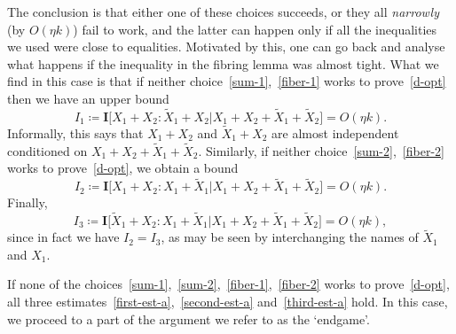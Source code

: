\documentclass[12pt,reqno,tbtags]{amsart}
\theoremstyle{definition}
\theoremstyle{remark}
\newcommand{\bigI}[1]{\mathbf{I}\big[#1\big]}
\numberwithin{equation}{section}
\begin{document}
The conclusion is that either one of these choices succeeds, or they all \emph{narrowly} (by $O(\eta k)$) fail to work, and the latter can happen only if all the inequalities we used were close to equalities. Motivated by this, one can go back and analyse what happens if the inequality in the fibring lemma was almost tight.
What we find in this case is that if neither choice~\eqref{sum-1},~\eqref{fiber-1} works to prove~\eqref{d-opt} then we have an upper bound
\begin{equation}\label{first-est-a}
  I_1 \coloneqq \bigI{ X_1+X_2 : \tilde X_1 + X_2 | X_1+X_2+\tilde X_1+\tilde X_2 } = O(\eta k).
\end{equation}
Informally, this says that $X_1 + X_2$ and $\tilde X_1 + X_2$ are almost independent conditioned on $X_1+X_2+\tilde X_1+\tilde X_2$.
Similarly, if neither choice~\eqref{sum-2},~\eqref{fiber-2} works to prove~\eqref{d-opt}, we obtain a bound
\begin{equation}\label{second-est-a}
  I_2 \coloneqq \bigI{ X_1+X_2 : X_1 + \tilde X_1 | X_1+X_2+\tilde X_1+\tilde X_2 } = O(\eta k).
\end{equation}
Finally,
\begin{equation}\label{third-est-a}
 I_3 \coloneqq \bigI{ \tilde X_1+X_2 : X_1 + \tilde X_1 | X_1+X_2+\tilde X_1+\tilde X_2 } = O(\eta k),
 \end{equation}
 since in fact we have $I_2 = I_3$, as may be seen by interchanging the names of $\tilde X_1$ and $X_1$.


If none of the choices~\eqref{sum-1},~\eqref{sum-2},~\eqref{fiber-1},~\eqref{fiber-2} works to prove~\eqref{d-opt}, all three estimates~\eqref{first-est-a},~\eqref{second-est-a} and~\eqref{third-est-a} hold.
In this case, we proceed to a part of the argument we refer to as the `endgame'.
\end{document}

